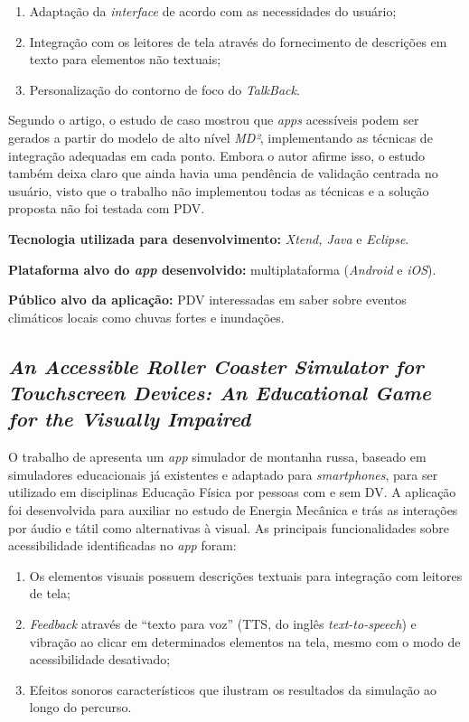 \begin{enumerate}
\item Adaptação da \emph{interface} de acordo com as necessidades do usuário;
\item Integração com os leitores de tela através do fornecimento de descrições em texto para elementos não textuais;
\item Personalização do contorno de foco do \emph{TalkBack}.
\end{enumerate}

Segundo o artigo, o estudo de caso mostrou que \emph{apps} acessíveis podem ser gerados a partir do modelo de alto nível \emph{MD²}, implementando as técnicas de integração adequadas em cada ponto.
Embora o autor afirme isso, o estudo também deixa claro que ainda havia uma pendência de validação centrada no usuário, visto que o trabalho não implementou todas as técnicas e a solução proposta não foi testada com PDV\@.

\textbf{Tecnologia utilizada para desenvolvimento:} \emph{Xtend, Java} e \emph{Eclipse}.

\textbf{Plataforma alvo do \emph{app} desenvolvido:} multiplataforma (\emph{Android} e \emph{iOS}).

\textbf{Público alvo da aplicação:} PDV interessadas em saber sobre eventos climáticos locais como chuvas fortes e inundações.

\subsection{\emph{An Accessible Roller Coaster Simulator for Touchscreen Devices: An Educational Game for the Visually Impaired}}

O trabalho de  apresenta um \emph{app} simulador de montanha russa, baseado em simuladores educacionais já existentes e adaptado para \emph{smartphones}, para ser utilizado em disciplinas Educação Física por pessoas com e sem DV\@.
A aplicação foi desenvolvida para auxiliar no estudo de Energia Mecânica e trás as interações por áudio e tátil como alternativas à visual.
As principais funcionalidades sobre acessibilidade identificadas no \emph{app} foram:

\begin{enumerate}
\item Os elementos visuais possuem descrições textuais para integração com leitores de tela;
\item \emph{Feedback} através de ``texto para voz'' (TTS, do inglês \emph{text-to-speech}) e vibração ao clicar em determinados elementos na tela, mesmo com o modo de acessibilidade desativado;
\item Efeitos sonoros característicos que ilustram os resultados da simulação ao longo do percurso.
\end{enumerate}

